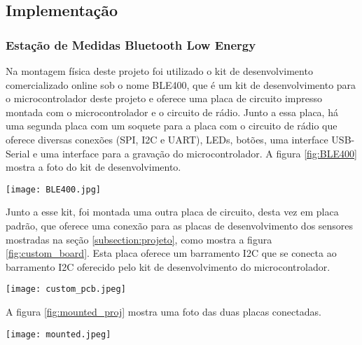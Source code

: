 \subsection{Implementação}

\subsubsection{Estação de Medidas Bluetooth Low Energy}


Na montagem física deste projeto foi utilizado o kit de desenvolvimento
comercializado online sob o nome BLE400, que é um kit de desenvolvimento para o
microcontrolador deste projeto e oferece uma placa de circuito impresso
montada com o microcontrolador e o circuito de rádio. Junto a essa placa, há uma
segunda placa com um soquete para a placa com o circuito de rádio que oferece
diversas conexões (SPI, I2C e UART), LEDs, botões, uma interface USB-Serial e
uma interface para a gravação do microcontrolador. A figura \ref{fig:BLE400}
mostra a foto do kit de desenvolvimento.

\begin{center}
	\centering 
	\texttt{[image: BLE400.jpg]}  
	\label{fig:BLE400}
\end{center} 

Junto a esse kit, foi montada uma outra placa de circuito, desta vez em placa
padrão, que oferece uma conexão para as placas de desenvolvimento dos sensores
mostradas na seção \ref{subsection:projeto}, como mostra a figura
\ref{fig:custom_board}. Esta placa oferece um barramento I2C que se conecta ao
barramento I2C oferecido pelo kit de desenvolvimento do microcontrolador.

\begin{center}
	\centering 
	\texttt{[image: custom\_pcb.jpeg]}
	\label{fig:custom_board}
\end{center} 

A figura \ref{fig:mounted_proj} mostra uma foto das duas placas conectadas.

\begin{center}
	\centering 
	\texttt{[image: mounted.jpeg]} 
	\label{fig:mounted_proj}
\end{center} 



